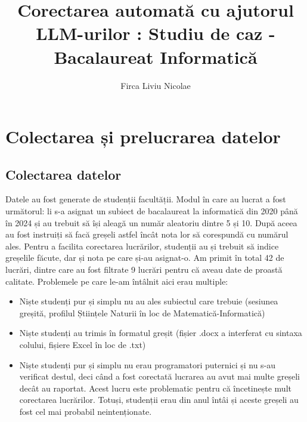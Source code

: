 \documentclass[12pt, a4paper]{report}
\title{Corectarea automată cu ajutorul LLM-urilor : Studiu de caz - Bacalaureat Informatică}
\author{Firca Liviu Nicolae}
\begin{document}
\cleardoublepage
\let\ps@plain


\restoregeometry
{}


\addtocounter{page}{1}



\tableofcontents

\cleardoublepage
\pagestyle{main}
\let\ps@plain\ps@main



\chapter{Colectarea și prelucrarea datelor}
\section{Colectarea datelor}
Datele au fost generate de studenții facultății. Modul în care au lucrat a fost următorul: li s-a asignat un subiect de bacalaureat la informatică din 2020 până în 2024 și au trebuit să își aleagă un număr aleatoriu dintre 5 și 10. După aceea au fost instruiți să facă greșeli astfel încât nota lor să corespundă cu numărul ales.  
Pentru a facilita corectarea lucrărilor, studenții au și trebuit să indice greșelile făcute, dar și nota pe care și-au asignat-o.  
Am primit în total 42 de lucrări, dintre care au fost filtrate 9 lucrări pentru că aveau date de proastă calitate.  
Problemele pe care le-am întâlnit aici erau multiple:  
\begin{itemize}
  \item Niște studenți pur și simplu nu au ales subiectul care trebuie (sesiunea greșită, profilul Științele Naturii în loc de Matematică-Informatică)
  \item Niște studenți au trimis în formatul greșit (fișier .docx a interferat cu sintaxa colului, fișiere Excel în loc de .txt)
  \item Niște studenți pur și simplu nu erau programatori puternici și nu s-au verificat destul, deci când a fost corectată lucrarea au
  avut mai multe greșeli decât au raportat. Acest lucru este problematic pentru că încetinește mult corectarea lucrărilor. Totuși, studenții erau din anul întâi și aceste greșeli au fost cel mai probabil neintenționate.
\end{itemize}
\end{document}
